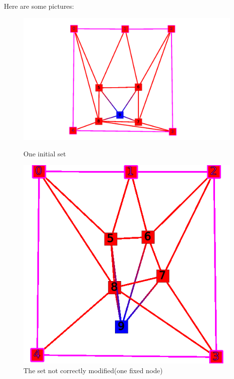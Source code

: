 Here are some pictures:




\begin{figure}[!h]
  \begin{minipage}[!h]{.5\linewidth}
   \centering
   \includegraphics[scale=0.25]{snapshots/constate_fix_init.png}
   \caption{One initial set}
   \label{mauvais_1}
 \end{minipage} \hfill
 \begin{minipage}[!h]{.3\linewidth}
   \includegraphics[scale=0.35]{snapshots/constate_probleme.png}
   \caption{The set not correctly modified(one fixed node)}
   \label{mauvais_2}
 \end{minipage}
\end{figure}

